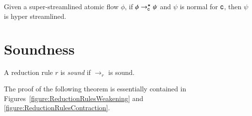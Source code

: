 \begin{theorem}\label{theorem:HyperStreamlining}
Given a super-streamlined atomic flow $\phi$, if $\phi\to_{\mathsf c}^\star\psi$ and $\psi$ is normal for ${\mathsf c}$, then $\psi$ is hyper streamlined.
\end{theorem}


\section{Soundness}\label{section:Soundness}

\begin{definition}\label{definition:SoundRedcutionRule}
A reduction rule $r$ is \emph{sound} if $\to_r$ is sound.
\end{definition}

The proof of the following theorem is essentially contained in Figures~\vref{figure:ReductionRulesWeakening} and \vref{figure:ReductionRulesContraction}.

